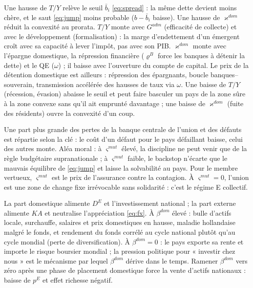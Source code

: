 \documentclass[11pt,a4paper]{article}
\newcommand{\og}{« }
\newcommand{\fg}{ »}
\begin{document}
\direct Une hausse de $T/Y$ relève le seuil $\bar b_i$ \eqref{eq:spread} : la même dette devient moins chère, et le saut \eqref{eq:jump} moins probable ($b-\bar b_i$ baisse). Une hausse de $\varkappa^{dom}$ réduit la convexité au prorata.
\second $T/Y$ monte avec $G^{adm}$ (efficacité de collecte) et avec le développement (formalisation) : la marge d'endettement d'un émergent croît avec sa capacité à lever l'impôt, pas avec son PIB. $\varkappa^{dom}$ monte avec l'épargne domestique, la répression financière ($\varrho^B$ force les banques à détenir la dette) et le QE ($\omega$) ; il baisse avec l'ouverture du compte de capital. Le prix de la détention domestique est ailleurs : répression des épargnants, boucle banques--souverain, transmission accélérée des hausses de taux via $\omega$.
\baisse Une baisse de $T/Y$ (récession, évasion) abaisse le seuil et peut faire basculer un pays de la zone sûre à la zone convexe sans qu'il ait emprunté davantage ; une baisse de $\varkappa^{dom}$ (fuite des résidents) ouvre la convexité d'un coup.

\direct Une part plus grande des pertes de la banque centrale de l'union et des défauts est répartie selon la clé : le coût d'un défaut pour le pays défaillant baisse, celui des autres monte.
\second Aléa moral : à $\varsigma^{mut}$ élevé, la discipline ne peut venir que de la règle budgétaire supranationale ; à $\varsigma^{mut}$ faible, le backstop n'écarte que le mauvais équilibre de \eqref{eq:jump} et laisse la solvabilité au pays. Pour le membre vertueux, $\varsigma^{mut}$ est le prix de l'assurance contre la contagion.
\baisse À $\varsigma^{mut}=0$, l'union est une zone de change fixe irrévocable sans solidarité : c'est le régime E collectif.

\direct La part domestique alimente $D^E$ et l'investissement national ; la part externe alimente $KA$ et neutralise l'appréciation \eqref{eq:fx}.
\second À $\beta^{dom}$ élevé : bulle d'actifs locale, surchauffe, salaires et prix domestiques en hausse, maladie hollandaise malgré le fonds, et rendement du fonds corrélé au cycle national plutôt qu'au cycle mondial (perte de diversification). À $\beta^{dom}=0$ : le pays exporte sa rente et importe le risque boursier mondial ; la pression politique pour \og investir chez nous\fg{} est le mécanisme par lequel $\beta^{dom}$ dérive dans le temps.
\baisse Ramener $\beta^{dom}$ vers zéro après une phase de placement domestique force la vente d'actifs nationaux : baisse de $p^E$ et effet richesse négatif.
\end{document}
